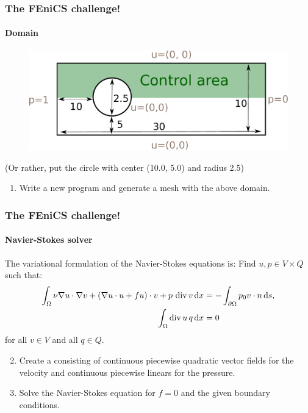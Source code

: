 \begin{frame}
    \frametitle{The FEniCS challenge!}
    \framesubtitle{Domain}

    \begin{figure}
    \begin{center}
        \includegraphics[width=\textwidth]{pdf/optimisation_challenge_domain}
    \end{center}
    \end{figure}

    (Or rather, put the circle with center (10.0, 5.0) and radius 2.5)

    \begin{enumerate}
        \item Write a new program and generate a mesh with the above domain.
    \end{enumerate}

\end{frame}


\begin{frame}
    \frametitle{The FEniCS challenge!}
    \framesubtitle{Navier-Stokes solver}

    The variational formulation of the Navier-Stokes equations is: Find $u, p \in V \times Q$ such that:
    \begin{equation*}
        \begin{aligned}
            \int_\Omega \nu \nabla u \cdot \nabla v + (\nabla u \cdot u + fu) \cdot v +  p \, \operatorname{\mathrm{div}} v \, \mathrm{d}x & = - \int_{\partial \Omega} p_0 v \cdot n \, \mathrm{d}s, \\
            \int_\Omega \operatorname{\mathrm{div}} u \, q \, \mathrm{d}x & = 0 \\
    \end{aligned}
    \end{equation*}
    for all $v \in V$ and all $q \in Q$.

    \begin{enumerate}
        \setcounter{enumi}{1}

        \item Create a  consisting of
          continuous piecewise quadratic vector fields for the
          velocity and continuous piecewise linears for the pressure.

        \item Solve the Navier-Stokes equation for $f=0$ and the given
          boundary conditions.
    \end{enumerate}

\end{frame}


